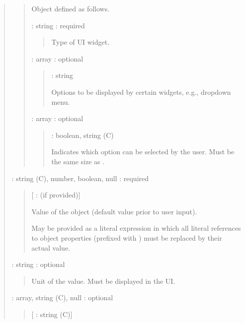 \documentclass[letterpaper,10pt, openany,english]{sphinxmanual}
\begin{document}
\begin{quote}
\begin{quote}
Object defined as follows.

 : string : required
\begin{quote}

Type of UI widget.
\end{quote}

 : array : optional
\begin{quote}

 : string

Options to be displayed by certain widgets, e.g., dropdown menu.
\end{quote}

 : array : optional
\begin{quote}

 : boolean, string (C)

Indicates which option can be selected by the user. Must be the same size as .
\end{quote}
\end{quote}

 : string (C), number, boolean, null : required
\begin{quote}

{[} :  (if provided){]}

\begin{DUlineblock}{0em}
\item[] Value of the object (default value prior to user input).
\item[] May be provided as a literal expression in which all literal references to object properties (prefixed with \sphinxcode{\sphinxupquote{\#}}) must be replaced by their actual value.
\end{DUlineblock}
\end{quote}

 : string : optional
\begin{quote}

Unit of the value. Must be displayed in the UI.
\end{quote}

 : array, string (C), null : optional
\begin{quote}

{[} : string (C){]}


\end{quote}
\end{quote}
\end{document}
